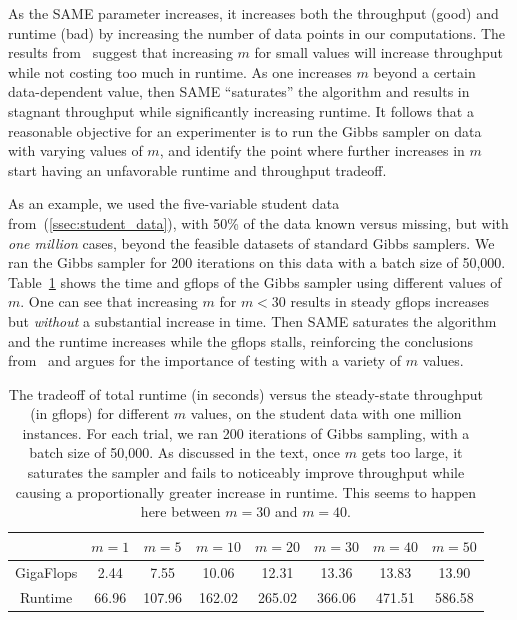\documentclass{article} %
\begin{document}
As the SAME parameter increases, it increases both the throughput (good) and runtime (bad) by
increasing the number of data points in our computations. The results from~\citep{SAME2015} suggest
that increasing $m$ for small values will increase throughput while not costing too much in runtime.
As one increases $m$ beyond a certain data-dependent value, then SAME ``saturates'' the algorithm
and results in stagnant throughput while significantly increasing runtime. It follows that a
reasonable objective for an experimenter is to run the Gibbs sampler on data with varying values of
$m$, and identify the point where further increases in $m$ start having an unfavorable runtime and
throughput tradeoff.

As an example, we used the five-variable student data from~(\ref{ssec:student_data}), with 50\% of
the data known versus missing, but with \emph{one million} cases, beyond the feasible datasets of
standard Gibbs samplers. We ran the Gibbs sampler for 200 iterations on this data with a batch size
of 50,000. Table~\ref{tab:tradeoff} shows the time and gflops of the Gibbs sampler using different
values of $m$.  One can see that increasing $m$ for $m < 30$ results in steady gflops increases but
\emph{without} a substantial increase in time. Then SAME saturates the algorithm and the runtime
increases while the gflops stalls, reinforcing the conclusions from~\citep{SAME2015} and argues for
the importance of testing with a variety of $m$ values.

\begin{table}[t]
\caption{The tradeoff of total runtime (in seconds) versus the steady-state throughput (in gflops)
for different $m$ values, on the student data with one million instances. For each trial, we ran 200
iterations of Gibbs sampling, with a batch size of 50,000. As discussed in the text, once $m$ gets
too large, it saturates the sampler and fails to noticeably improve throughput while causing a
proportionally greater increase in runtime. This seems to happen here between $m=30$ and $m=40$.}
\label{tab:tradeoff}
\begin{center}
\begin{tabular}{ |c|c|c|c|c|c|c|c| } 
\hline
          & $m=1$ & $m=5$  & $m=10$ & $m=20$ & $m=30$  & $m=40$  & $m=50$  \\
\hline \hline
GigaFlops & 2.44  & 7.55   & 10.06  & 12.31  & 13.36  & 13.83  & 13.90   \\ 
Runtime   & 66.96 & 107.96 & 162.02 & 265.02 & 366.06 & 471.51 & 586.58  \\
\hline
\end{tabular}
\end{center}
\end{table}
\end{document}

